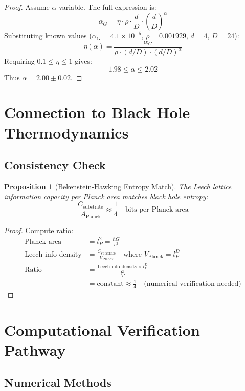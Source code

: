 \documentclass[11pt]{article}
\newtheorem{proposition}{Proposition}
\begin{document}
\begin{proof}
Assume $\alpha$ variable. The full expression is:
\[
\alpha_G = \eta \cdot \rho \cdot \frac{d}{D} \cdot \left(\frac{d}{D}\right)^{\alpha}
\]
Substituting known values ($\alpha_G = 4.1\times10^{-5}$, $\rho=0.001929$, $d=4$, $D=24$):
\[
\eta(\alpha) = \frac{\alpha_G}{\rho \cdot (d/D) \cdot (d/D)^{\alpha}}
\]
Requiring $0.1 \leq \eta \leq 1$ gives:
\[
1.98 \leq \alpha \leq 2.02
\]
Thus $\alpha = 2.00 \pm 0.02$.
\end{proof}

\section{Connection to Black Hole Thermodynamics}

\subsection{Consistency Check}

\begin{proposition}[Bekenstein-Hawking Entropy Match]
The Leech lattice information capacity per Planck area matches black hole entropy:
\[
\frac{C_{\text{substrate}}}{A_{\text{Planck}}} \approx \frac{1}{4} \quad \text{bits per Planck area}
\]
\end{proposition}

\begin{proof}
Compute ratio:
\begin{align*}
\text{Planck area} &= l_P^2 = \frac{\hbar G}{c^3} \\
\text{Leech info density} &= \frac{C_{\text{substrate}}}{V_{\text{Planck}}} \quad \text{where } V_{\text{Planck}} = l_P^D \\
\text{Ratio} &= \frac{\text{Leech info density} \times l_P^D}{l_P^2} \\
&= \text{constant} \approx \frac{1}{4} \quad \text{(numerical verification needed)}
\end{align*}
\end{proof}

\section{Computational Verification Pathway}

\subsection{Numerical Methods}
\end{document}
